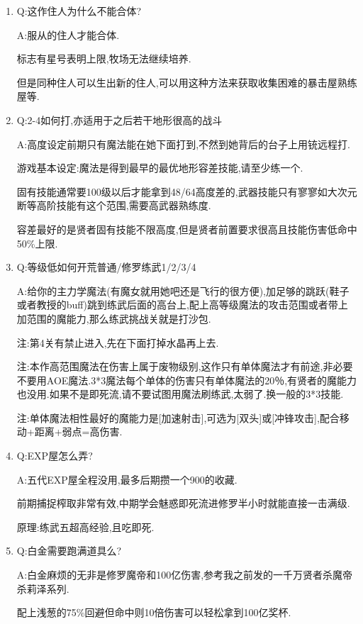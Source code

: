 \begin{enumerate}

	\item
	Q:这作住人为什么不能合体?

	A:服从的住人才能合体.

	标志有星号表明上限,牧场无法继续培养.

	但是同种住人可以生出新的住人,可以用这种方法来获取收集困难的暴击屋熟练屋等.

	\item
	Q:2-4如何打,亦适用于之后若干地形很高的战斗

	A:高度设定前期只有魔法能在她下面打到,不然到她背后的台子上用铳远程打.

	游戏基本设定:魔法是得到最早的最优地形容差技能,请至少练一个.

	固有技能通常要100级以后才能拿到48/64高度差的,武器技能只有寥寥如大次元断等高阶技能有这个范围,需要高武器熟练度.

	容差最好的是贤者固有技能不限高度,但是贤者前置要求很高且技能伤害低命中50\%上限.

	\item
	Q:等级低如何开荒普通/修罗练武1/2/3/4

	A:给你的主力学魔法(有魔女就用她吧还是飞行的很方便),加足够的跳跃(鞋子或者教授的buff)跳到练武后面的高台上,配上高等级魔法的攻击范围或者带上加范围的魔能力,那么练武挑战关就是打沙包.

	注:第4关有禁止进入,先在下面打掉水晶再上去.

	注:本作高范围魔法在伤害上属于废物级别,这作只有单体魔法才有前途,非必要不要用AOE魔法.3*3魔法每个单体的伤害只有单体魔法的20％,有贤者的魔能力也没用.如果不是即死流,请不要试图用魔法刷练武,太弱了.换一般的3*3技能.

	注:单体魔法相性最好的魔能力是[加速射击],可选为[双头]或[冲锋攻击],配合移动+距离+弱点=高伤害.

	\item
	Q:EXP屋怎么弄?

	A:五代EXP屋全程没用,最多后期攒一个900的收藏.

	前期捕捉榨取非常有效,中期学会魅惑即死流进修罗半小时就能直接一击满级.

	原理:练武五超高经验,且吃即死.

	\item 
	Q:白金需要跑满道具么?

	A:白金麻烦的无非是修罗魔帝和100亿伤害,参考我之前发的一千万贤者杀魔帝杀莉泽系列.

	配上浅葱的75\%回避但命中则10倍伤害可以轻松拿到100亿奖杯.


\end{enumerate}
